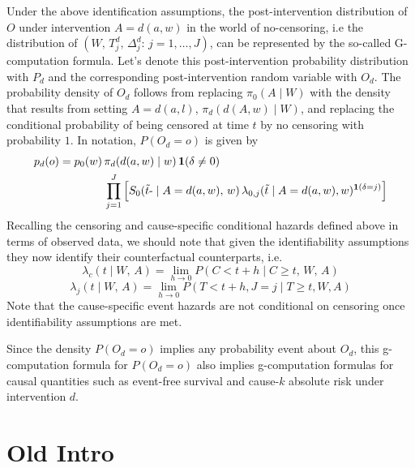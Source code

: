 \documentclass{report}
\newcommand{\1}{\ensuremath{\mathbf{1}}}
\renewcommand{\t}{\ensuremath{\Tilde{t}}}
\newcommand{\g}{\ensuremath{\pi}}
\renewcommand{\L}{\ensuremath{W}}
\renewcommand{\l}{\ensuremath{w}}
\begin{document}
Under the above identification assumptions, the post-intervention distribution of \(O\) under intervention \(A=d(a, \l)\) in the world of no-censoring, i.e the distribution of \((\L,\, T^d_j,\, \Delta^d_j :\, j = 1, \dots, J)\), can be represented by the so-called G-computation formula. Let’s denote this post-intervention probability distribution with \(P_{d}\) and the corresponding post-intervention random variable with \(O_d\). The probability density of \(O_d\) follows from replacing \(\g_0(A \mid \L)\) with the density that results from setting \(A = d(a, l)\), \(\g_d(d(A, \l) \mid \L)\), and replacing the conditional probability of being censored at time \(t\) by no censoring with probability \(1\). In notation, \(P(O_d = o)\) is given by
\begin{align*}
p_{d}(o) = p_{0}(\l) \, &\g_d(d(a, \l) \mid \l) \, \1(\delta \neq 0)\\
&\prod_{j=1}^{J} \left[S_{0}(\t\text{-} \mid A = d(a, \l),\, \l) \, \lambda_{0,j}(\t \mid A = d(a, \l), \l)^{\1(\delta = j)} \right]
\end{align*}
Recalling the censoring and cause-specific conditional hazards defined above in terms of observed data, we should note that given the identifiability assumptions they now identify their counterfactual counterparts, i.e. 
\[\lambda_{c}(t \mid W,\, A) = \lim_{h \to 0}P(C < t + h \mid C \geq t,\, W,\, A)\]
\[\lambda_{j}(t \mid W,\, A)= \lim_{h \to 0}P(T < t+h, J=j \mid T \geq t, W, A)\]
Note that the cause-specific event hazards are not conditional on censoring once identifiability assumptions are met.

Since the density \(P(O_d=o)\) implies any probability event about \(O_d\), this g-computation formula for \(P(O_d=o)\) also implies g-computation formulas for causal quantities such as event-free survival and cause-\(k\) absolute risk under intervention \(d\). 


\section{Old Intro}
\label{sec:org61d15f3}
\end{document}
